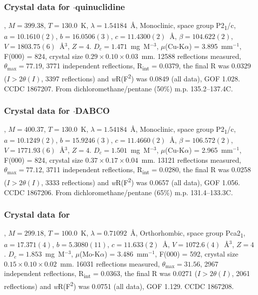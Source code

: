 \subsubsection{Crystal data for $\cdot$quinuclidine}
, $M=399.38$, $T=130.0$~K, $\lambda=1.54184$~\AA, Monoclinic, space group P2\textsubscript{1}/c, $a = 10.1610(2)$, $b = 16.0506(3)$, $c = 11.4300(2)$~\AA, $\beta = 104.622(2)$\degree, $V = 1803.75(6)$~\AA$^{3}$, $Z = 4$.
$D_{c}= 1.471$~mg~M$^{-3}$, $\mu$(Cu-K$\alpha$) = 3.895~mm$^{-1}$, F(000) = 824, crystal size $0.29 \times 0.10 \times 0.03$~mm.
12588 reflections measured, $\theta_{\mathrm{max}} = 77.19$\degree, 3771 independent reflections, R\textsubscript{int} = 0.0379, the final R was 0.0329 ($I > 2\theta(I)$, 3397 reflections) and \emph{w}R(F\textsuperscript{2}) was 0.0849 (all data), GOF 1.028. 
CCDC 1867207. 
From dichloromethane/pentane (50\%) m.p. 135.2--137.4\degree C.

\subsubsection{Crystal data for $\cdot$DABCO}
, $M=400.37$, $T=130.0$~K, $\lambda=1.54184$~\AA, Monoclinic, space group P2\textsubscript{1}/c, $a = 10.1249(2)$, $b = 15.9246(3)$, $c = 11.4660(2)$~\AA, $\beta = 106.572(2)$\degree, $V = 1771.93(6)$~\AA$^{3}$, $Z = 4$.
$D_{c} = 1.501$~mg~M$^{-3}$, $\mu$(Cu-K$\alpha$) = 2.965~mm$^{-1}$, F(000) = 824, crystal size $0.37 \times 0.17 \times 0.04$~mm.
13121 reflections measured, $\theta_{\mathrm{max}} = 77.12$\degree, 3711 independent reflections, R\textsubscript{int} = 0.0280, the final R was 0.0258 ($I > 2\theta(I)$, 3333 reflections) and \emph{w}R(F\textsuperscript{2}) was 0.0657 (all data), GOF 1.056. 
CCDC 1867206. 
From dichloromethane/pentane (65\%) m.p. 131.4--133.3\degree C.

\subsubsection{Crystal data for }
, $M=299.18$, $T=100.0$~K, $\lambda=0.71092$~\AA, Orthorhombic, space group Pca2\textsubscript{1}, $a = 17.371(4)$, $b = 5.3080(11)$, $c = 11.633(2)$~\AA, $V = 1072.6(4)$~\AA$^{3}$, $Z = 4$.
$D_{c}= 1.853$~mg~M$^{-3}$, $\mu$(Mo-K$\alpha$) = 3.486~mm$^{-1}$, F(000) = 592, crystal size $0.15 \times 0.10 \times 0.02$~mm.
16031 reflections measured, $\theta_{\mathrm{max}}=31.56$\degree, 2967 independent reflections, R\textsubscript{int} = 0.0363, the final R was 0.0271 ($I > 2\theta(I)$, 2061 reflections) and \emph{w}R(F\textsuperscript{2}) was 0.0751 (all data), GOF 1.129. 
CCDC 1867208. 

